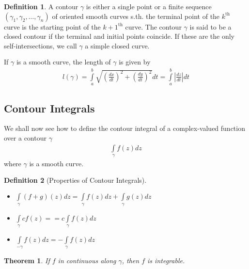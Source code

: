 \documentclass[12pt, a4paper]{article}
\theoremstyle{plain}
\newtheorem{thm}{Theorem} %
\theoremstyle{definition}
\newtheorem{definition}{Definition} %
\begin{document}
		\begin{definition}
			A contour $\gamma$ is either a single point or a finite sequence $(\gamma_1,\gamma_2,\ldots,\gamma_n)$ of oriented smooth curves s.th. the terminal point of the $k^{\mathrm{th}}$ curve is the starting point of the $k+1^{\mathrm{th}}$ curve. The contour $\gamma$ is said to be a closed contour if the terminal and initial points coincide. If these are the only self-intersections, we call $\gamma$ a simple closed curve.
		\end{definition}

		If $\gamma$ is a smooth curve, the length of $\gamma$ is given by
		\begin{align*}
			l(\gamma) = 
			\int\limits_{a}^{b}\sqrt{\left(\frac{dx}{dt}\right)^2+\left(\frac{dy}{dt}\right)^2}dt = 
			\int\limits_{a}^{b}\left|\frac{dz}{dt}\right| dt
		\end{align*}

		\subsection{Contour Integrals} %
		\label{sub:contour_integrals}
			We shall now see how to define the contour integral of a complex-valued function over a contour $\gamma$
			\begin{align*}
				\int\limits_{\gamma}f(z)dz
			\end{align*}
			where $\gamma$ is a  smooth curve.\\

			\begin{definition}[Properties of Contour Integrals]
			~\\
				\begin{itemize}
					\item $\displaystyle\int\limits_{\gamma}(f+g)(z)dz = \int\limits_{\gamma}f(z)dz + \int\limits_{\gamma}g(z)dz$
					\item $\displaystyle\int\limits_{\gamma}cf(z) = = c\int\limits_{\gamma}f(z)dz$
					\item $\displaystyle\int\limits_{-\gamma}f(z)dz = -\int\limits_{\gamma}f(z)dz$\\
				\end{itemize}
			\end{definition}

			\begin{thm}
			\label{thm:integrability}
				If $f$ in continuous along $\gamma$, then $f$ is integrable.
			\end{thm}
\end{document}
